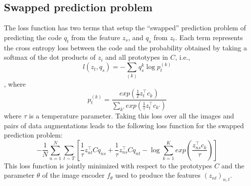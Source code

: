 \documentclass[conference]{IEEEtran}
\begin{document}
\subsection{Swapped prediction problem}
The loss function has two terms that setup the ``swapped'' prediction problem of predicting the code $q_t$ from the feature $z_s$, and $q_s$ from $z_t$. 
Each term represents the cross entropy loss between the code and the probability obtained by taking a softmax of the dot products of $z_i$ and all prototypes in $C$, i.e.,
\begin{equation}
    l(z_t, q_s) = -\sum_{(k)}q_s^{k}\log p_t^{(k)}
\end{equation}
, where
\begin{equation}
    p_t^{(k)} = \frac{exp(\frac{1}{T}z_t^{\top}c_k)}{\sum_{k'}exp(\frac{1}{\tau}z_t^{\top}c_{k'})} 
\end{equation}
where $\tau$ is a temperature parameter. Taking this loss over all the images and pairs of data augmentations leads to the following loss function for the swapped prediction problem:
\begin{equation}
    -\frac{1}{N}\sum_{n=1}^{N}\sum_{t \sim T}[ \frac{1}{\tau}z_{nt}^{\top}Cq_{ns}+ \frac{1}{\tau}z_{ns}^{\top}Cq_{nt} -\log\sum^{K}_{k=1}exp(\frac{z_{ns}^{\top}c_k}{\tau})]
\end{equation}
This loss function is jointly minimized with respect to the prototypes $C$ and the parameter $\theta$ of the image encoder $f_\theta$ used to produce the features $(z_{nt})_{n,t}$.
\end{document}
